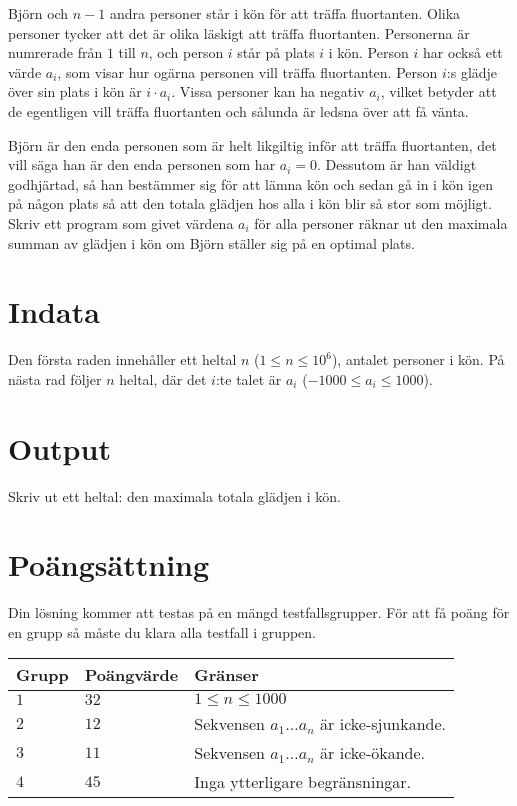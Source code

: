 Björn och $n-1$ andra personer står i kön för att träffa fluortanten. Olika personer tycker att det är olika läskigt att träffa fluortanten. Personerna är numrerade från $1$ till $n$, och person $i$ står på plats $i$ i kön. Person $i$ har också ett värde $a_i$, som visar hur ogärna personen vill träffa fluortanten. Person $i$:s glädje över sin plats i kön är $i \cdot a_i$. Vissa personer kan ha negativ $a_i$,
vilket betyder att de egentligen vill träffa fluortanten och sålunda är ledsna över att få vänta.

Björn är den enda personen som är helt likgiltig inför att träffa fluortanten, det vill säga han är den enda personen som har $a_i = 0$. Dessutom är han väldigt godhjärtad, så han bestämmer sig för att lämna kön och sedan gå in i kön igen på någon plats så att den totala glädjen hos alla i kön blir så stor som möjligt. Skriv ett program som givet värdena $a_i$ för alla personer räknar ut den maximala summan av glädjen i kön om Björn ställer sig på en optimal plats.

\section*{Indata}
Den första raden innehåller ett heltal $n$ ($1 \le n \le 10^6$), antalet personer i kön. På nästa rad följer $n$ heltal, där det $i$:te talet är $a_i$ ($-1000 \le a_i \le 1000$).

\section*{Output}
Skriv ut ett heltal: den maximala totala glädjen i kön.

\section*{Poängsättning}
Din lösning kommer att testas på en mängd testfallsgrupper.
För att få poäng för en grupp så måste du klara alla testfall i gruppen.

\noindent
\begin{tabular}{| l | l | p{12cm} |}
  \hline
  Grupp & Poängvärde & Gränser \\ \hline
    $1$   & $32$     & $1 \leq n \leq 1000$ \\ \hline
    $2$   & $12$     & Sekvensen $a_1 \dots a_n$ är icke-sjunkande. \\ \hline
    $3$   & $11$     & Sekvensen $a_1 \dots a_n$ är icke-ökande. \\ \hline
    $4$   & $45$     & Inga ytterligare begränsningar. \\ \hline
\end{tabular}

